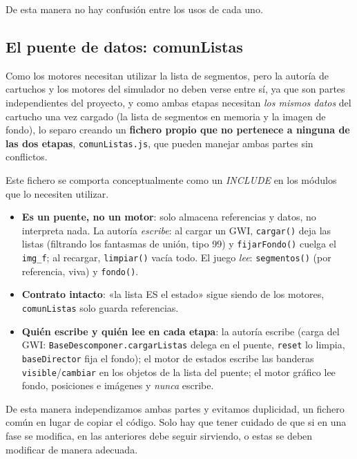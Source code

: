   De esta manera no hay confusión entre los usos de cada uno.
  
\subsection{El puente de datos: comunListas}
\label{subsec:comunListas}
  
Como los motores necesitan utilizar la lista de segmentos, pero la autoría de cartuchos y los motores del simulador no deben verse entre sí, ya que son partes independientes del proyecto, y como ambas etapas necesitan \emph{los mismos datos} del cartucho una vez cargado
  (la lista de segmentos en memoria y la imagen de fondo), lo separo creando un \textbf{fichero propio que no pertenece a ninguna de las dos etapas}, \texttt{comunListas.js}, que pueden manejar ambas partes sin conflictos.
  
Este fichero se comporta conceptualmente como un \emph{INCLUDE} en los módulos que lo necesiten utilizar.
  
  \begin{itemize}
  	\item \textbf{Es un puente, no un motor}: solo almacena referencias y datos, no interpreta
  	nada. La autoría \emph{escribe}: al cargar un GWI, \texttt{cargar()} deja las listas
  	(filtrando los fantasmas de unión, tipo 99) y \texttt{fijarFondo()} cuelga el
  	\texttt{img\_f}; al recargar, \texttt{limpiar()} vacía todo. El juego \emph{lee}:
  	\texttt{segmentos()} (por referencia, viva) y \texttt{fondo()}.
  	
  	\item \textbf{Contrato intacto}: «la lista ES el estado» sigue siendo de los motores, 
  	 \texttt{comunListas} solo guarda referencias.
  	
  	\item \textbf{Quién escribe y quién lee en cada etapa}: la autoría escribe (carga del
  	GWI: \texttt{BaseDescomponer.cargarListas} delega en el puente, \texttt{reset} lo
  	limpia, \texttt{baseDirector} fija el fondo); el motor de estados escribe las banderas
  	\texttt{visible}/\texttt{cambiar} en los objetos de la lista del puente; el motor
  	gráfico lee fondo, posiciones e imágenes y \emph{nunca} escribe.
  \end{itemize}
  
De esta manera independizamos ambas partes y evitamos duplicidad, un fichero común en lugar de copiar el código. Solo hay que tener cuidado de que si en una fase se modifica, en las anteriores debe seguir sirviendo, o estas se deben modificar de manera adecuada.
  
